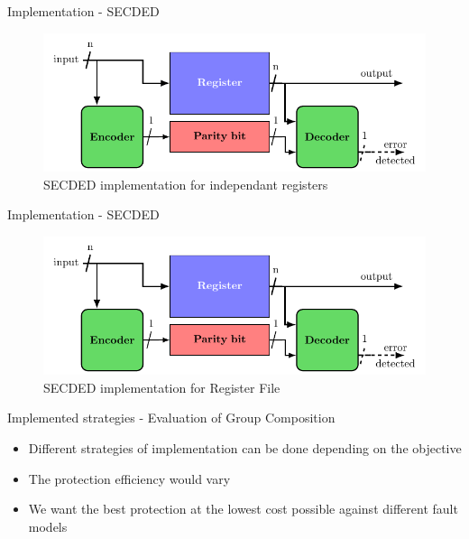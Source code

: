 \begin{frame}{Implementation - SECDED}
    \begin{figure}
        \centering
        \includegraphics[width=.8\textwidth, page=4]{src/4_strategies/img/archi_contremesures.pdf}
        \caption{SECDED implementation for independant registers}
        \label{fig:secded_implem_independant_register}
    \end{figure}
\end{frame}

\begin{frame}{Implementation - SECDED}
    \begin{figure}
        \centering
        \includegraphics[width=.9\textwidth, page=5]{src/4_strategies/img/archi_contremesures.pdf}
        \caption{SECDED implementation for Register File}
        \label{fig:secded_implem_rf}
    \end{figure}
\end{frame}
\begin{frame}{Implemented strategies - Evaluation of Group Composition}
    \begin{block}{}
        \begin{itemize}
            \justifying
            \item Different strategies of implementation can be done depending on the objective
            \item The protection efficiency would vary
            \item We want the best protection at the lowest cost possible against different fault models
        \end{itemize}
    \end{block}
\end{frame}

